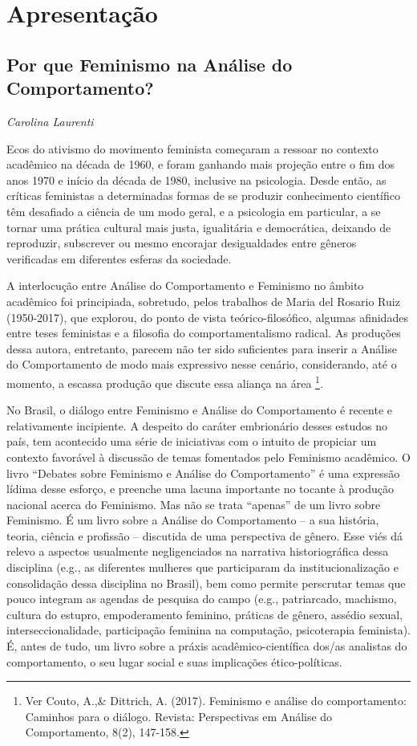 \chapter*{Apresentação}
\section*{Por que Feminismo na Análise do Comportamento?}
\begin{flushright}
    \emph{Carolina Laurenti}
\end{flushright}

Ecos do ativismo do movimento feminista começaram a ressoar no contexto acadêmico na década de 1960, e foram ganhando mais projeção entre o fim dos anos 1970 e início da década de 1980, inclusive na psicologia. Desde então, as críticas feministas a determinadas formas de se produzir conhecimento científico têm desafiado a ciência de um modo geral, e a psicologia em particular, a se tornar uma prática cultural mais justa, igualitária e democrática, deixando de reproduzir, subscrever ou mesmo encorajar desigualdades entre gêneros verificadas em diferentes esferas da sociedade. 

A interlocução entre Análise do Comportamento e Feminismo no âmbito acadêmico foi principiada, sobretudo, pelos trabalhos de Maria del Rosario Ruiz (1950-2017), que explorou, do ponto de vista teórico-filosófico, algumas afinidades entre teses feministas e a filosofia do comportamentalismo radical. As produções dessa autora, entretanto, parecem não ter sido suficientes para inserir a Análise do Comportamento de modo mais expressivo nesse cenário, considerando, até o momento, a escassa produção que discute essa aliança na área \footnote{Ver Couto, A.,\& Dittrich, A. (2017). Feminismo e análise do comportamento: Caminhos para o diálogo. Revista: Perspectivas em Análise do Comportamento, 8(2), 147-158.}.

No Brasil, o diálogo entre Feminismo e Análise do Comportamento é recente e relativamente incipiente. A despeito do caráter embrionário desses estudos no país, tem acontecido uma série de iniciativas com o intuito de propiciar um contexto favorável à discussão de temas fomentados pelo Feminismo acadêmico. O livro “Debates sobre Feminismo e Análise do Comportamento” é uma expressão lídima desse esforço, e preenche uma lacuna importante no tocante à produção nacional acerca do Feminismo. Mas não se trata “apenas” de um livro sobre Feminismo. É um livro sobre a Análise do Comportamento – a sua história, teoria, ciência e profissão – discutida de uma perspectiva de gênero. Esse viés dá relevo a aspectos usualmente negligenciados na narrativa historiográfica dessa disciplina (e.g., as diferentes mulheres que participaram da institucionalização e consolidação dessa disciplina no Brasil), bem como permite perscrutar temas que pouco integram as agendas de pesquisa do campo (e.g., patriarcado, machismo, cultura do estupro, empoderamento feminino, práticas de gênero, assédio sexual, interseccionalidade, participação feminina na computação, psicoterapia feminista). É, antes de tudo, um livro sobre a práxis acadêmico-científica dos/as analistas do comportamento, o seu lugar social e suas implicações ético-políticas.

